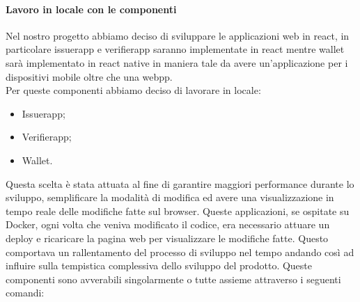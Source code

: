 \paragraph{Lavoro in locale con le componenti}
Nel nostro progetto abbiamo deciso di sviluppare le applicazioni web in react, in particolare issuerapp  e verifierapp saranno implementate in react mentre wallet sarà implementato in react native in maniera tale da avere un'applicazione per i dispositivi mobile oltre che una webpp. \\
Per queste componenti abbiamo deciso di lavorare in locale:
\begin{itemize}
\item Issuerapp;
\item Verifierapp;
\item Wallet.
\end{itemize}
Questa scelta è stata attuata al fine di garantire maggiori performance durante lo sviluppo, semplificare la modalità di modifica ed avere una visualizzazione in tempo reale delle modifiche fatte sul browser. 
Queste applicazioni, se ospitate su Docker, ogni volta che veniva modificato il codice, era necessario attuare un deploy e ricaricare la pagina web per visualizzare le modifiche fatte. Questo comportava un rallentamento del processo di sviluppo nel tempo andando così ad influire sulla tempistica complessiva dello sviluppo del prodotto. 
Queste componenti sono avverabili singolarmente o tutte assieme attraverso i seguenti comandi:
